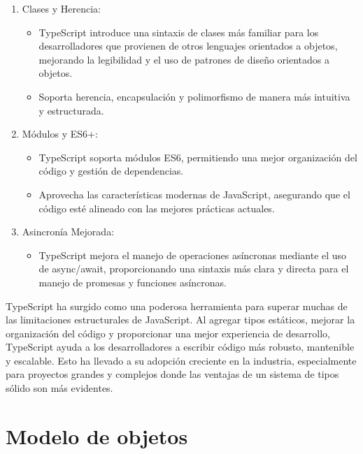 \documentclass{article}
\begin{document}
\begin{enumerate}
      \item Clases y Herencia:
            \begin{itemize}
                  \item TypeScript introduce una sintaxis de clases más familiar para los desarrolladores que provienen
                        de otros lenguajes orientados a objetos, mejorando la legibilidad y el uso de patrones de diseño
                        orientados a objetos.
                  \item  Soporta herencia, encapsulación y polimorfismo de manera más intuitiva y estructurada.
            \end{itemize}
      \item Módulos y ES6+:
            \begin{itemize}
                  \item TypeScript soporta módulos ES6, permitiendo una mejor organización del código y gestión de
                        dependencias.
                  \item Aprovecha las características modernas de JavaScript, asegurando que el código esté alineado con
                        las mejores prácticas actuales.
            \end{itemize}
      \item Asincronía Mejorada:
            \begin{itemize}
                  \item TypeScript mejora el manejo de operaciones asíncronas mediante el uso de async/await,
                        proporcionando una sintaxis más clara y directa para el manejo de promesas y funciones asíncronas.
            \end{itemize}
\end{enumerate}

TypeScript ha surgido como una poderosa herramienta para superar muchas de las limitaciones estructurales de
JavaScript. Al agregar tipos estáticos, mejorar la organización del código y proporcionar una mejor experiencia
de desarrollo, TypeScript ayuda a los desarrolladores a escribir código más robusto, mantenible y escalable. Esto
ha llevado a su adopción creciente en la industria, especialmente para proyectos grandes y complejos donde las
ventajas de un sistema de tipos sólido son más evidentes.

\section{Modelo de objetos}
\end{document}
